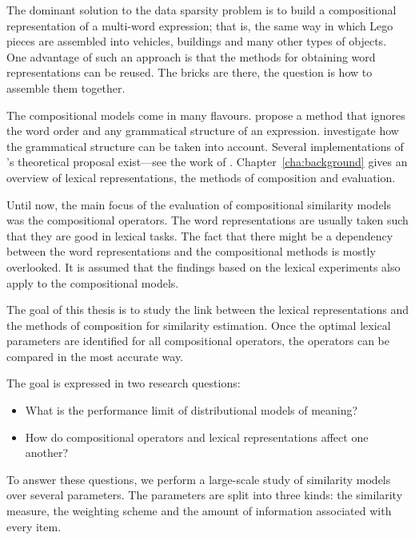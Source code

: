 The dominant solution to the data sparsity problem is to build a compositional representation of a multi-word expression; that is, the same way in which Lego pieces are assembled into vehicles, buildings and many other types of objects. One advantage of such an approach is that the methods for obtaining word representations can be reused. The bricks are there, the question is how to assemble them together.

The compositional models come in many flavours. \citet{mitchell2010composition} propose a method that ignores the word order and any grammatical structure of an expression. \citet{DBLP:journals/corr/abs-1003-4394,baroni2014frege} investigate how the grammatical structure can be taken into account. Several implementations of \citet{DBLP:journals/corr/abs-1003-4394}'s theoretical proposal exist---see the work of \citet{Grefenstette:2011:ESC:2145432.2145580,Grefenstette:2011:ETV:2140490.2140497,kartsadrqpl2014,fried-polajnar-clark:2015:ACL-IJCNLP}. Chapter~\ref{cha:background} gives an overview of lexical representations, the methods of composition and evaluation.

Until now, the main focus of the evaluation of compositional similarity models was the compositional operators. The word representations are usually taken such that they are good in lexical tasks. The fact that there might be a dependency between the word representations and the compositional methods is mostly overlooked. It is assumed that the findings based on the lexical experiments also apply to the compositional models.

The goal of this thesis is to study the link between the lexical representations and the methods of composition for similarity estimation. Once the optimal lexical parameters are identified for all compositional operators, the operators can be compared in the most accurate way.

The goal is expressed in two research questions:
\begin{itemize}
\item What is the performance limit of distributional models of meaning?
\item How do compositional operators and lexical representations affect one another?
\end{itemize}

To answer these questions, we perform a large-scale study of similarity models over several parameters. The parameters are split into three kinds: the similarity measure, the weighting scheme and the amount of information associated with every item.\footnotemark{}

